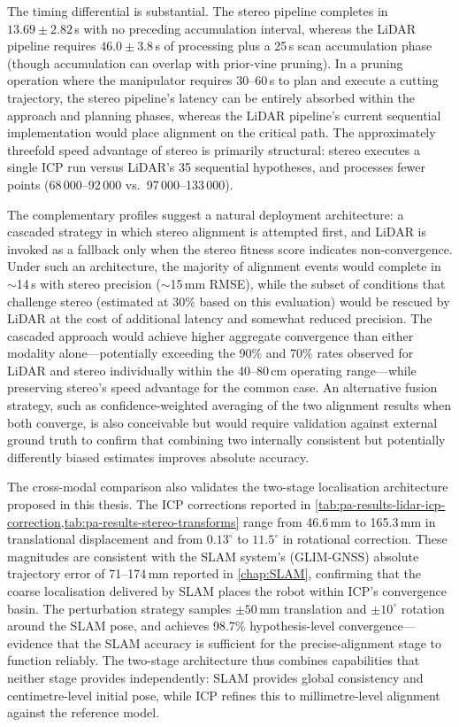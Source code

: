 The timing differential is substantial. The stereo pipeline completes in $13.69 \pm 2.82$\,s with no preceding accumulation interval, whereas the LiDAR pipeline requires $46.0 \pm 3.8$\,s of processing plus a 25\,s scan accumulation phase (though accumulation can overlap with prior-vine pruning). In a pruning operation where the manipulator requires 30--60\,s to plan and execute a cutting trajectory, the stereo pipeline's latency can be entirely absorbed within the approach and planning phases, whereas the LiDAR pipeline's current sequential implementation would place alignment on the critical path. The approximately threefold speed advantage of stereo is primarily structural: stereo executes a single ICP run versus LiDAR's 35 sequential hypotheses, and processes fewer points (68\,000--92\,000 vs.\ 97\,000--133\,000).

The complementary profiles suggest a natural deployment architecture: a cascaded strategy in which stereo alignment is attempted first, and LiDAR is invoked as a fallback only when the stereo fitness score indicates non-convergence. Under such an architecture, the majority of alignment events would complete in $\sim$14\,s with stereo precision ($\sim$15\,mm RMSE), while the subset of conditions that challenge stereo (estimated at 30\% based on this evaluation) would be rescued by LiDAR at the cost of additional latency and somewhat reduced precision. The cascaded approach would achieve higher aggregate convergence than either modality alone---potentially exceeding the 90\% and 70\% rates observed for LiDAR and stereo individually within the 40--80\,cm operating range---while preserving stereo's speed advantage for the common case. An alternative fusion strategy, such as confidence-weighted averaging of the two alignment results when both converge, is also conceivable but would require validation against external ground truth to confirm that combining two internally consistent but potentially differently biased estimates improves absolute accuracy.

The cross-modal comparison also validates the two-stage localisation architecture proposed in this thesis. The ICP corrections reported in \cref{tab:pa-results-lidar-icp-correction,tab:pa-results-stereo-transforms} range from 46.6\,mm to 165.3\,mm in translational displacement and from $0.13^{\circ}$ to $11.5^{\circ}$ in rotational correction. These magnitudes are consistent with the SLAM system's (GLIM-GNSS) absolute trajectory error of 71--174\,mm reported in \cref{chap:SLAM}, confirming that the coarse localisation delivered by SLAM places the robot within ICP's convergence basin. The perturbation strategy samples $\pm 50$\,mm translation and $\pm 10^{\circ}$ rotation around the SLAM pose, and achieves 98.7\% hypothesis-level convergence---evidence that the SLAM accuracy is sufficient for the precise-alignment stage to function reliably. The two-stage architecture thus combines capabilities that neither stage provides independently: SLAM provides global consistency and centimetre-level initial pose, while ICP refines this to millimetre-level alignment against the reference model.

